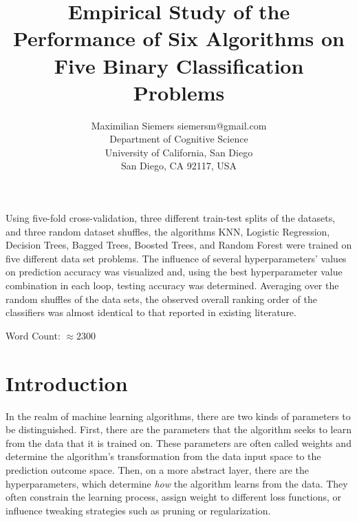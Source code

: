\documentclass[twoside,11pt]{article}
\begin{document}
	
	\title{Empirical Study of the Performance of Six Algorithms on Five Binary Classification Problems}
	
	\author{\name Maximilian Siemers \email siemersm@gmail.com \\
		\addr Department of Cognitive Science\\
		University of California, San Diego\\
		San Diego, CA 92117, USA}
	
	
	\maketitle
	
	\begin{abstract}%
		
	\end{abstract}
		Using five-fold cross-validation, three different train-test splits of the datasets, and three random dataset shuffles, the algorithms KNN, Logistic Regression, Decision Trees, Bagged Trees, Boosted Trees, and Random Forest were trained on five different data set problems. The influence of several hyperparameters' values on prediction accuracy was visualized and, using the best hyperparameter value combination in each loop, testing accuracy was determined. Averaging over the random shuffles of the data sets, the observed overall ranking order of the classifiers was almost identical to that reported in existing literature.
	
	Word Count: $\approx 2300$
	
	\section{Introduction}
		In the realm of machine learning algorithms, there are two kinds of parameters to be distinguished. First, there are the parameters that the algorithm seeks to learn from the data that it is trained on. These parameters are often called weights and determine the algorithm's transformation from the data input space to the prediction outcome space. Then, on a more abstract layer, there are the hyperparameters, which determine \textit{how} the algorithm learns from the data. They often constrain the learning process, assign weight to different loss functions, or influence tweaking strategies such as pruning or regularization.
		
\end{document}
